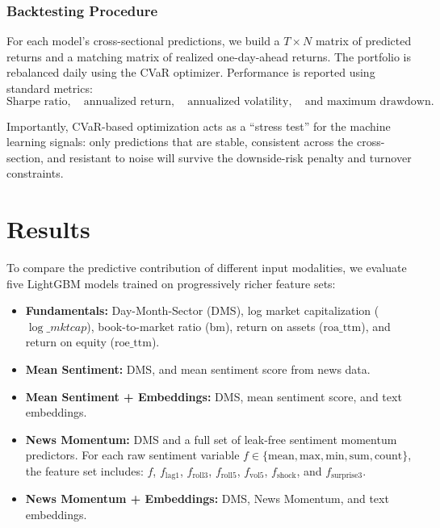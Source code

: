 \documentclass[11pt]{article}
\begin{document}
\subsubsection{Backtesting Procedure}
For each model's cross-sectional predictions, we build a $T \times N$ matrix of
predicted returns and a matching matrix of realized one-day-ahead returns. The
portfolio is rebalanced daily using the CVaR optimizer. Performance is reported
using standard metrics:
\[
\text{Sharpe ratio},\quad
\text{annualized return},\quad
\text{annualized volatility},\quad
\text{and maximum drawdown}.
\]

\noindent Importantly, CVaR-based optimization acts as a ``stress test'' for the machine
learning signals: only predictions that are stable, consistent across the
cross-section, and resistant to noise will survive the downside-risk penalty
and turnover constraints.

\section{Results}
To compare the predictive contribution of different input modalities, we evaluate five LightGBM models trained on progressively richer feature sets:

\begin{itemize}
    \item \textbf{Fundamentals:} Day-Month-Sector (DMS), log market capitalization ($\log\_mktcap$), book-to-market ratio (bm), return on assets ($\text{roa\_ttm}$), and return on equity ($\text{roe\_ttm}$).
    \item \textbf{Mean Sentiment:} DMS, and mean sentiment score from news data.
    \item \textbf{Mean Sentiment + Embeddings:} DMS, mean sentiment score, and text embeddings.
    \item \textbf{News Momentum:} DMS and a full set of leak-free sentiment momentum predictors.  
    For each raw sentiment variable $f \in \{\text{mean},\text{max},\text{min},\text{sum},\text{count}\}$,  
    the feature set includes:
    $f$, $f_{\text{lag1}}$, $f_{\text{roll3}}$, $f_{\text{roll5}}$, $f_{\text{vol5}}$, $f_{\text{shock}}$, and $f_{\text{surprise3}}$.
    \item \textbf{News Momentum + Embeddings:} DMS, News Momentum, and text embeddings.

\end{itemize}
\end{document}
